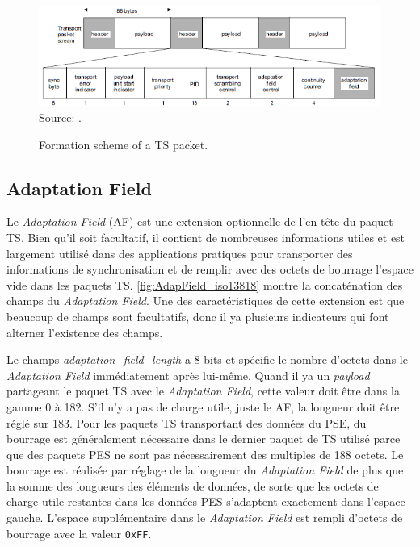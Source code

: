 \documentclass[12pt,a4paper]{article}
\begin{document}
\begin{figure}[!h]
\centering
\caption{Formation scheme of a TS packet.}
\includegraphics[width=1\linewidth]{pictures/TS_iso13818.png}
\\Source: \cite[F.0.1]{ISO}.
\label{fig:TS_iso13818}
\end{figure}


\subsection{Adaptation Field}

Le \textit{Adaptation Field} (AF) est une extension optionnelle de l'en-tête du paquet TS. Bien qu'il soit facultatif, il contient de nombreuses informations utiles et est largement utilisé dans des applications pratiques pour transporter des informations de synchronisation et de remplir avec des octets de bourrage l'espace vide dans les paquets TS. \autoref{fig:AdapField_iso13818} montre la concaténation des champs du \textit{Adaptation Field}. Une des caractéristiques de cette extension est que beaucoup de champs sont facultatifs, donc il ya plusieurs indicateurs qui font alterner l'existence des champs.

Le champs \textit{adaptation\hspace{0.1mm}\_\hspace{0.1mm}field\hspace{0.1mm}\_\hspace{0.1mm}length} a 8 bits et spécifie le nombre d'octets dans le \textit{Adaptation Field} immédiatement après lui-même. Quand il ya un \textit{payload} partageant le paquet TS avec le \textit{Adaptation Field}, cette valeur doit être dans la gamme 0 à 182. S'il n'y a pas de charge utile, juste le AF, la longueur doit être réglé sur 183. Pour les paquets TS transportant des données du PSE, du bourrage est généralement nécessaire dans le dernier paquet de TS utilisé parce que des paquets PES ne sont pas nécessairement des multiples de 188 octets. Le bourrage est réalisée par réglage de la longueur du \textit{Adaptation Field} de plus que la somme des longueurs des éléments de données, de sorte que les octets de charge utile restantes dans les données PES s'adaptent exactement dans l'espace gauche. L'espace supplémentaire dans le \textit{Adaptation Field} est rempli d'octets de bourrage avec la valeur \texttt{0xFF}.
\end{document}
